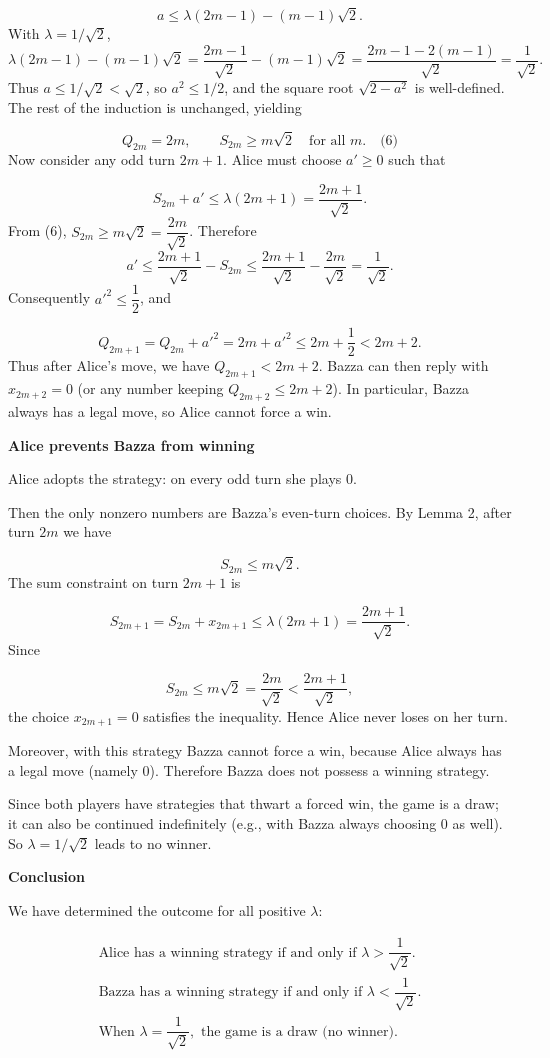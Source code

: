 \documentclass{llmxive}
\providecommand{\solutionheading}[1]{\par\smallskip\noindent\textbf{#1}\par}
\begin{document}
\[
a \le \lambda(2m-1) - (m-1)\sqrt{2}.
\]
With \(\lambda = 1/\sqrt{2}\),
\[
\lambda(2m-1) - (m-1)\sqrt{2} = \frac{2m-1}{\sqrt{2}} - (m-1)\sqrt{2} = \frac{2m-1 - 2(m-1)}{\sqrt{2}} = \frac{1}{\sqrt{2}}.
\]
Thus \(a \le 1/\sqrt{2} < \sqrt{2}\), so \(a^2 \le 1/2\), and the square root \(\sqrt{2 - a^2}\) is well-defined. The rest of the induction is unchanged, yielding\par
\[
Q_{2m}=2m, \qquad S_{2m} \ge m\sqrt{2} \quad\text{for all } m. \quad\text{(6)}
\]
Now consider any odd turn \(2m+1\). Alice must choose \(a' \ge 0\) such that\par
\[
S_{2m} + a' \le \lambda(2m+1) = \dfrac{2m+1}{\sqrt{2}}.
\]
From (6), \(S_{2m} \ge m\sqrt{2} = \dfrac{2m}{\sqrt{2}}\). Therefore
\[
a' \le \frac{2m+1}{\sqrt{2}} - S_{2m} \le \frac{2m+1}{\sqrt{2}} - \frac{2m}{\sqrt{2}} = \frac{1}{\sqrt{2}}.
\]
Consequently \(a'^2 \le \dfrac{1}{2}\), and\par
\[
Q_{2m+1} = Q_{2m} + a'^2 = 2m + a'^2 \le 2m + \frac{1}{2} < 2m+2.
\]
Thus after Alice's move, we have \(Q_{2m+1} < 2m+2\). Bazza can then reply with \(x_{2m+2}=0\) (or any number keeping \(Q_{2m+2} \le 2m+2\)). In particular, Bazza always has a legal move, so Alice cannot force a win.\par
\solutionheading{Alice prevents Bazza from winning}
Alice adopts the strategy: on every odd turn she plays \(0\).\par
Then the only nonzero numbers are Bazza's even-turn choices. By Lemma 2, after turn \(2m\) we have\par
\[
S_{2m} \le m\sqrt{2}.
\]
The sum constraint on turn \(2m+1\) is\par
\[
S_{2m+1} = S_{2m} + x_{2m+1} \le \lambda(2m+1) = \dfrac{2m+1}{\sqrt{2}}.
\]
Since\par
\[
S_{2m} \le m\sqrt{2} = \dfrac{2m}{\sqrt{2}} < \dfrac{2m+1}{\sqrt{2}},
\]
the choice \(x_{2m+1}=0\) satisfies the inequality. Hence Alice never loses on her turn.\par
Moreover, with this strategy Bazza cannot force a win, because Alice always has a legal move (namely \(0\)). Therefore Bazza does not possess a winning strategy.\par
Since both players have strategies that thwart a forced win, the game is a draw; it can also be continued indefinitely (e.g., with Bazza always choosing \(0\) as well). So \(\lambda = 1/\sqrt{2}\) leads to no winner.\par
\smallskip
\solutionheading{Conclusion}
We have determined the outcome for all positive \(\lambda\):\par
\[
\boxed{
\begin{array}{l}
\text{Alice has a winning strategy if and only if } \lambda > \dfrac{1}{\sqrt{2}}. \\[6pt]
\text{Bazza has a winning strategy if and only if } \lambda < \dfrac{1}{\sqrt{2}}. \\[6pt]
\text{When } \lambda = \dfrac{1}{\sqrt{2}}, \text{ the game is a draw (no winner).}
\end{array}
}
\]
\par
\end{document}
